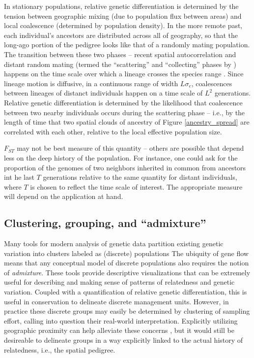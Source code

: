 \documentclass{ar-1col}
\newcommand{\plr}[1]{{\color{green}{#1}}}
\begin{document}
In stationary populations,
relative genetic differentiation is determined by the tension between 
geographic mixing (due to population flux between areas)
and local coalescence (determined by population density).
In the more remote past, each individual's ancestors are distributed across
all of geography,
so that the long-ago portion of the pedigree looks like that of a randomly mating population.
The transition between these two phases -- recent spatial autocorrelation and distant random mating
(termed the ``scattering'' and ``collecting'' phases  by \citet{wilkins2004separationoftimescales})
happens on the time scale over which a lineage crosses the species range \citep{Wakeley1999}.
Since lineage motion is diffusive, in a continuous range of width $L \sigma_e$,
coalescences between lineages of distanct individuals happen on a time scale of $L^2$ generations.
Relative genetic differentiation
is determined by the likelihood that coalescence between two nearby individuals
occurs during the scattering phase
-- i.e., by the length of time that two spatial clouds of ancestry of Figure \ref{ancestry_spread}
are correlated with each other,
relative to the local effective population size.

$F_{ST}$ may not be best measure of this quantity -- 
others are possible that depend less on the deep history of the population.
For instance,
one could ask for the proportion of the genomes of two neighbors inherited in common from ancestors int he last $T$ generations
relative to the same quantity for distant individuals,
where $T$ is chosen to reflect the time scale of interest.
The appropriate measure will depend on the application at hand.

\subsection{Clustering, grouping, and ``admixture''}

\plr{I think there's some redundancy below.}

Many tools for modern analysis of genetic data
partition existing genetic variation into clusters labeled as (discrete) populations
\citep[e.g.,][]{STRUCTURE, ADMIXTURE}
The ubiquity of gene flow means that
any conceptual model of discrete populations also requires the notion of \emph{admixture}.
These tools provide descriptive visualizations 
that can be extremely useful for
describing and making sense of patterns of relatedness and genetic variation.
Coupled with a quantification of relative genetic differentiation,
this is useful in conservation to delineate discrete management units.
However, in practice these discrete groups may easily be determined
by clustering of sampling effort,
calling into question their real-world interpretation.
Explicitly utilizing geographic proximity can help alleviate these concerns \citep{conStruct},
but it would still be desireable to delineate groups in a way explicitly linked
to the actual history of relatedness, i.e., the spatial pedigree.
\end{document}
